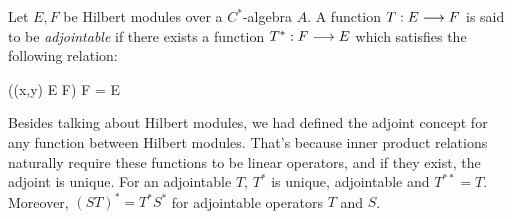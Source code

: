\begin{definicao}[Adjoint]
    Let $E, F$ be Hilbert modules over a $C^*$-algebra $A$. A function $T:E\longrightarrow F$ is said to be \textit{adjointable} if there exists a function $T^*: F\longrightarrow E$ which satisfies the following relation:
    \begin{eqspaced*}{((x,y) \in E \times F)}
    F = E
    \end{eqspaced*}
    Besides talking about Hilbert modules, we had defined the adjoint concept for any function between Hilbert modules. That's because inner product relations naturally require these functions to be linear operators, and if they exist, the adjoint is unique. For an adjointable $T$, $T^*$ is unique, adjointable and $T^{**} = T$. Moreover, $(ST)^* = T^*S^*$ for adjointable operators $T$ and $S$.
\end{definicao}
    
